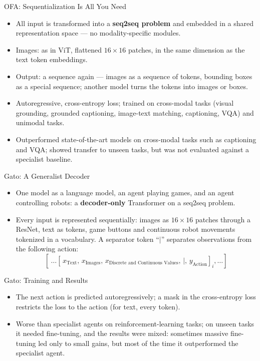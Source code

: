 \begin{frame}{OFA: Sequentialization Is All You Need}
\begin{itemize}
  \item All input is transformed into a \textbf{seq2seq problem} and embedded in a shared representation space --- no modality-specific modules.
  \item Images: as in ViT, flattened $16\times16$ patches, in the same dimension as the text token embeddings.
  \item Output: a sequence again --- images as a sequence of tokens, bounding boxes as a special sequence; another model turns the tokens into images or boxes.
  \item Autoregressive, cross-entropy loss; trained on cross-modal tasks (visual grounding, grounded captioning, image-text matching, captioning, VQA) and unimodal tasks.
  \item Outperformed state-of-the-art models on cross-modal tasks such as captioning and VQA; showed transfer to unseen tasks, but was not evaluated against a specialist baseline.
\end{itemize}
\end{frame}

\begin{frame}{Gato: A Generalist Decoder}
\begin{itemize}
  \item One model as a language model, an agent playing games, and an agent controlling robots: a \textbf{decoder-only} Transformer on a seq2seq problem.
  \item Every input is represented sequentially: images as $16\times16$ patches through a ResNet, text as tokens, game buttons and continuous robot movements tokenized in a vocabulary. A separator token ``$|$'' separates observations from the following action:
  \[ \left[\ \ldots \left[\, x_{\text{Text}},\, x_{\text{Images}},\, x_{\text{Discrete and Continuous Values}},\, |,\, y_{\text{Action}} \right]_i, \ldots \right] \]
\end{itemize}
\end{frame}

\begin{frame}{Gato: Training and Results}
\begin{itemize}
  \item The next action is predicted autoregressively; a mask in the cross-entropy loss restricts the loss to the action (for text, every token).
  \item Worse than specialist agents on reinforcement-learning tasks; on unseen tasks it needed fine-tuning, and the results were mixed: sometimes massive fine-tuning led only to small gains, but most of the time it outperformed the specialist agent.
\end{itemize}
\end{frame}


